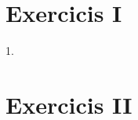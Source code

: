 \appendix
\section{Exercicis I}
\label{appendExe1}

\par 
1.

\appendix
\section{Exercicis II}
\label{appendExe2}
